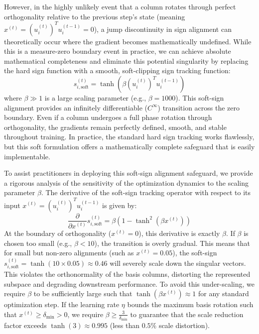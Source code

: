 However, in the highly unlikely event that a column rotates through perfect orthogonality relative to the previous step's state (meaning $x^{(t)} = (u_i^{(t)})^T u_i^{(t-1)} = 0$), a jump discontinuity in sign alignment can theoretically occur where the gradient becomes mathematically undefined. While this is a measure-zero boundary event in practice, we can achieve absolute mathematical completeness and eliminate this potential singularity by replacing the hard sign function with a smooth, soft-clipping sign tracking function:
\begin{equation}
    s_{i,\text{soft}}^{(t)} = \tanh\left( \beta (u_i^{(t)})^T u_i^{(t-1)} \right)
\end{equation}
where $\beta \gg 1$ is a large scaling parameter (e.g., $\beta = 1000$). This soft-sign alignment provides an infinitely differentiable ($C^\infty$) transition across the zero boundary. Even if a column undergoes a full phase rotation through orthogonality, the gradients remain perfectly defined, smooth, and stable throughout training. In practice, the standard hard sign tracking works flawlessly, but this soft formulation offers a mathematically complete safeguard that is easily implementable.

To assist practitioners in deploying this soft-sign alignment safeguard, we provide a rigorous analysis of the sensitivity of the optimization dynamics to the scaling parameter $\beta$. The derivative of the soft-sign tracking operator with respect to its input $x^{(t)} = (u_i^{(t)})^T u_i^{(t-1)}$ is given by:
\begin{equation}
    \frac{\partial}{\partial x^{(t)}} s_{i,\text{soft}}^{(t)} = \beta \left(1 - \tanh^2\left(\beta x^{(t)}\right)\right)
\end{equation}
At the boundary of orthogonality ($x^{(t)} = 0$), this derivative is exactly $\beta$. If $\beta$ is chosen too small (e.g., $\beta < 10$), the transition is overly gradual. This means that for small but non-zero alignments (such as $x^{(t)} = 0.05$), the soft-sign $s_{i,\text{soft}}^{(t)} = \tanh(10 \times 0.05) \approx 0.46$ will severely scale down the singular vectors. This violates the orthonormality of the basis columns, distorting the represented subspace and degrading downstream performance. To avoid this under-scaling, we require $\beta$ to be sufficiently large such that $\tanh(\beta x^{(t)}) \approx 1$ for any standard optimization step. If the learning rate $\eta$ bounds the maximum basis rotation such that $x^{(t)} \ge \delta_{\min} > 0$, we require $\beta \ge \frac{3}{\delta_{\min}}$ to guarantee that the scale reduction factor exceeds $\tanh(3) \approx 0.995$ (less than $0.5\%$ scale distortion).


